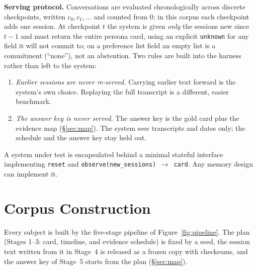 \documentclass{article}
\begin{document}
\textbf{Serving protocol.} Conversations are evaluated chronologically across discrete
checkpoints, written $c_0, c_1, \ldots$ and counted from 0; in this corpus each checkpoint adds one session. At checkpoint $t$ the system is
given \emph{only} the sessions new since $t-1$ and must return the entire persona card, using an
explicit \texttt{unknown} for any field it will not commit to; on a preference list field an empty
list is a commitment (``none''), not an abstention. Two rules are built into the
harness rather than left to the system:
\begin{enumerate}
  \item \emph{Earlier sessions are never re-served.} Carrying earlier text forward is the system's own
  choice. Replaying the full transcript is a different, easier benchmark.
  \item \emph{The answer key is never served.} The answer key is the gold card plus the evidence
  map (\S\ref{sec:map}). The system sees transcripts and dates only; the schedule and the answer
  key stay held out.
\end{enumerate}
A system under test is encapsulated behind a minimal stateful interface implementing
\texttt{reset} and \texttt{observe(new\_sessions) $\rightarrow$ card}. Any memory design can
implement it.

\section{Corpus Construction}
\label{sec:corpus}

Every subject is built by the five-stage pipeline of Figure~\ref{fig:pipeline}. The plan (Stages
1--3: card, timeline, and evidence schedule) is fixed by a seed, the session text written from it
in Stage~4 is released as a frozen copy with checksums, and the answer key of Stage~5 starts from
the plan (\S\ref{sec:map}).
\end{document}
